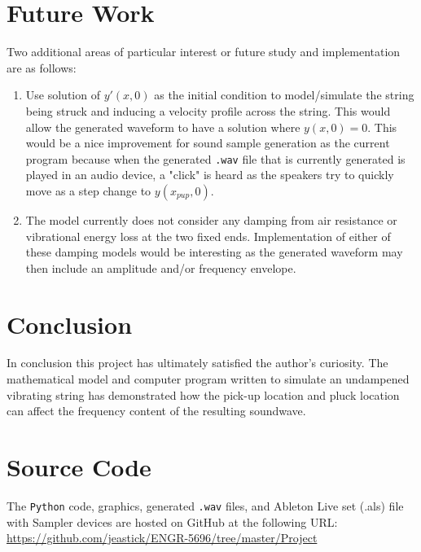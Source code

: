 \documentclass[%
 reprint,
 amsmath,amssymb,
 aps,
]{revtex4-1}
\begin{document}
\section{\label{sec:level1}Future Work}

Two additional areas of particular interest or future study and implementation are as follows:\\

\begin{enumerate}
  \item Use solution of $y'(x,0)$ as the initial condition to model/simulate the string being struck and inducing a velocity profile across the string. This would allow the generated waveform to have a solution where $y(x,0)=0$. This would be a nice improvement for sound sample generation as the current program because when the generated \texttt{.wav} file that is currently generated is played in an audio device, a "click" is heard as the speakers try to quickly move as a step change to $y(x_{pup},0)$.
  \item The model currently does not consider any damping from air resistance or vibrational energy loss at the two fixed ends. Implementation of either of these damping models would be interesting as the generated waveform may then include an amplitude and/or frequency envelope. 
\end{enumerate}

\section{\label{sec:level1}Conclusion}
In conclusion this project has ultimately satisfied the author's curiosity. The mathematical model and computer program written to simulate an undampened vibrating string has demonstrated how the pick-up location and pluck location can affect the frequency content of the resulting soundwave.\\

\section{\label{sec:level1}Source Code}
The \texttt{Python} code, graphics, generated \texttt{.wav} files, and Ableton Live set (.als) file with Sampler devices are hosted on GitHub at the following URL: 
\url{https://github.com/jeastick/ENGR-5696/tree/master/Project}
\end{document}
